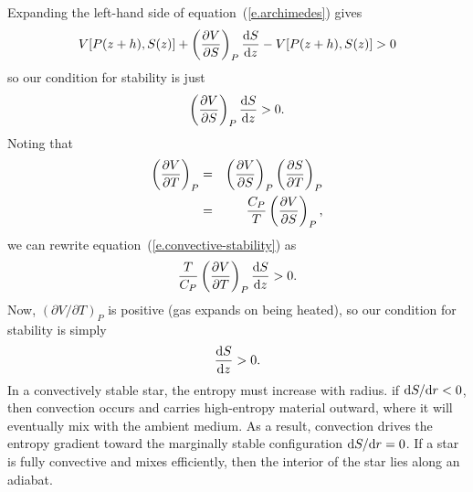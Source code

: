 Expanding the left-hand side of equation~(\ref{e.archimedes}) gives
\[
V[P(z+h),S(z)] + \left(\frac{\partial V}{\partial S}\right)_{P}\frac{\mathrm{d} S}{\mathrm{d} z} - V[P(z+h),S(z)] > 0 
\]
so our condition for stability is just
\begin{equation}\label{e.convective-stability}
\left(\frac{\partial V}{\partial S}\right)_{P}\frac{\mathrm{d} S}{\mathrm{d} z} > 0.
\end{equation}
Noting that
\begin{eqnarray*}
\left(\frac{\partial V}{\partial T}\right)_{P} &=& \left(\frac{\partial V}{\partial S}\right)_{P}\left(\frac{\partial S}{\partial T}\right)_{P}\\
 &=& \frac{C_{P}}{T}\left(\frac{\partial V}{\partial S}\right)_{P},
 \end{eqnarray*}
 we can rewrite equation~(\ref{e.convective-stability}) as
 \[
 \frac{T}{C_{P}}\left(\frac{\partial V}{\partial T}\right)_{P}\frac{\mathrm{d} S}{\mathrm{d} z} > 0.
 \]
 Now, $(\partial V/\partial T)_{P}$ is positive (gas expands on being heated), so our condition for stability is simply
 \begin{equation}\label{e.entropy-condition}
\frac{\mathrm{d} S}{\mathrm{d} z} > 0.
\end{equation}
In a convectively stable star, the entropy must increase with radius. if $\mathrm{d} S/\mathrm{d} r < 0$, then convection occurs and carries high-entropy material outward, where it will eventually mix with the ambient medium.  As a result, convection drives the entropy gradient toward the marginally stable configuration $\mathrm{d} S/\mathrm{d} r = 0$.  If a star is fully convective and mixes efficiently, then the interior of the star lies along an adiabat. 

